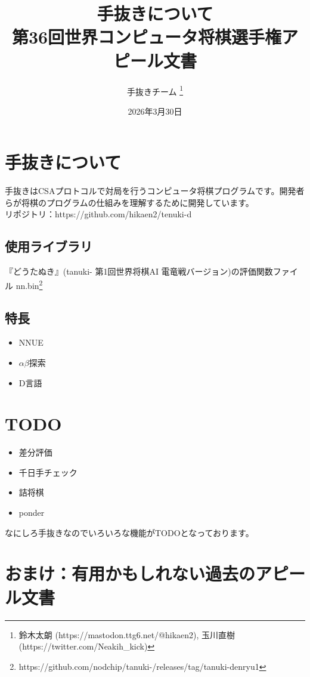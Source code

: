 \documentclass[11pt,a4paper]{ltjsarticle}
\title{
  手抜きについて
  \large{\\ 第36回世界コンピュータ将棋選手権アピール文書}
}
\author{手抜きチーム \thanks{鈴木太朗 (https://mastodon.ttg6.net/@hikaen2), 玉川直樹 (https://twitter.com/Neakih\_kick)} }
\date{2026年3月30日}
\begin{document}
\maketitle


\section*{手抜きについて}

手抜きはCSAプロトコルで対局を行うコンピュータ将棋プログラムです。開発者らが将棋のプログラムの仕組みを理解するために開発しています。 \\
リポジトリ：https://github.com/hikaen2/tenuki-d


\subsection*{使用ライブラリ}

『どうたぬき』(tanuki- 第1回世界将棋AI 電竜戦バージョン)の評価関数ファイル nn.bin\footnote{https://github.com/nodchip/tanuki-/releases/tag/tanuki-denryu1}


\subsection*{特長}

\begin{itemize}
  \item NNUE
  \item $\alpha\beta$探索
  \item D言語
\end{itemize}


\section*{TODO}

\begin{itemize}
  \item 差分評価
  \item 千日手チェック
  \item 詰将棋
  \item ponder
\end{itemize}

なにしろ手抜きなのでいろいろな機能がTODOとなっております。


\section*{おまけ：有用かもしれない過去のアピール文書}
\end{document}
